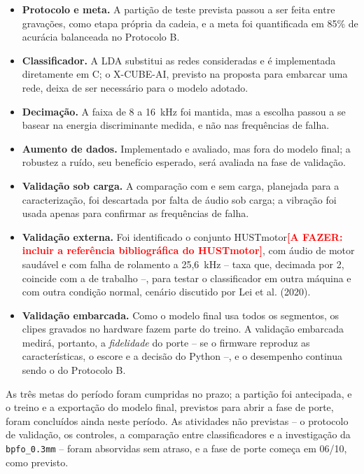 \documentclass[12pt,a4paper]{article}
\newcommand{\pendente}[1]{\textcolor{red}{\textbf{[A FAZER: #1]}}}
\begin{document}
\begin{itemize}[leftmargin=*]
  \item \textbf{Protocolo e meta.} A partição de teste prevista passou a ser feita entre gravações, como etapa própria da cadeia, e a meta foi quantificada em 85\% de acurácia balanceada no Protocolo B.
  \item \textbf{Classificador.} A LDA substitui as redes consideradas e é implementada diretamente em C; o X-CUBE-AI, previsto na proposta para embarcar uma rede, deixa de ser necessário para o modelo adotado.
  \item \textbf{Decimação.} A faixa de 8 a 16~kHz foi mantida, mas a escolha passou a se basear na energia discriminante medida, e não nas frequências de falha.
  \item \textbf{Aumento de dados.} Implementado e avaliado, mas fora do modelo final; a robustez a ruído, seu benefício esperado, será avaliada na fase de validação.
  \item \textbf{Validação sob carga.} A comparação com e sem carga, planejada para a caracterização, foi descartada por falta de áudio sob carga; a vibração foi usada apenas para confirmar as frequências de falha.
  \item \textbf{Validação externa.} Foi identificado o conjunto HUSTmotor\pendente{incluir a referência bibliográfica do HUSTmotor}, com áudio de motor saudável e com falha de rolamento a 25,6~kHz -- taxa que, decimada por 2, coincide com a de trabalho --, para testar o classificador em outra máquina e com outra condição normal, cenário discutido por Lei et al. (2020).
  \item \textbf{Validação embarcada.} Como o modelo final usa todos os segmentos, os clipes gravados no hardware fazem parte do treino. A validação embarcada medirá, portanto, a \emph{fidelidade} do porte -- se o firmware reproduz as características, o escore e a decisão do Python --, e o desempenho continua sendo o do Protocolo B.
\end{itemize}

As três metas do período foram cumpridas no prazo; a partição foi antecipada, e o treino e a exportação do modelo final, previstos para abrir a fase de porte, foram concluídos ainda neste período. As atividades não previstas -- o protocolo de validação, os controles, a comparação entre classificadores e a investigação da \texttt{bpfo\_0.3mm} -- foram absorvidas sem atraso, e a fase de porte começa em 06/10, como previsto.

\end{document}
